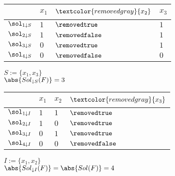\documentclass[preview]{standalone}
\begin{document}
	\begin{minipage}[t]{4cm}
	\begin{center}
	\begin{tabular}{C{0.6cm}|C{0.4cm}C{0.4cm}C{0.4cm}}
		~	& $x_1$	& $\textcolor{removedgray}{x_2}$	& $x_3$ \\ \midrule
		$\sol_{1 \downarrow S}$	& $1$		& $\removedtrue$	& $1$ \\
		$\sol_{2 \downarrow S}$	& $1$		& $\removedfalse$	& $1$ \\
		$\sol_{3 \downarrow S}$	& $0$		& $\removedtrue$	& $1$ \\
		$\sol_{4 \downarrow S}$	& $0$		& $\removedfalse$	& $0$ \\ \bottomrule
	\end{tabular}
	\vspace{2mm}
	
	$S := \{x_1, x_3\}$\\[2mm]
	$\abs{Sol_{\downarrow S}(F)} = 3$
	\end{center}
	\end{minipage}
	\qquad
	\begin{minipage}[t]{4cm}
	\begin{center}
	\begin{tabular}{C{0.6cm}|C{0.4cm}C{0.4cm}C{0.4cm}}
		~	& $x_1$	& $x_2$	& $\textcolor{removedgray}{x_3}$ \\ \midrule
		$\sol_{1 \downarrow I}$	& $1$		& $1$	& $\removedtrue$ \\
		$\sol_{2 \downarrow I}$	& $1$		& $0$	& $\removedtrue$ \\
		$\sol_{3 \downarrow I}$	& $0$		& $1$	& $\removedtrue$ \\
		$\sol_{4 \downarrow I}$	& $0$		& $0$	& $\removedfalse$ \\ \bottomrule
	\end{tabular}
	\vspace{2mm}
		
	$I := \{x_1, x_2\}$\\[2mm]
	$\abs{Sol_{\downarrow I}(F)} = \abs{Sol(F)} = 4$
	\end{center}
	\end{minipage}
\end{document}

